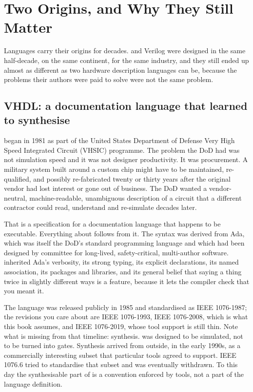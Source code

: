\section{Two Origins, and Why They Still Matter}
\label{sec:philosophy:origins}

Languages carry their origins for decades. \VHDL{} and Verilog were designed in
the same half-decade, on the same continent, for the same industry, and they
still ended up almost as different as two hardware description languages can
be, because the problems their authors were paid to solve were not the same
problem.

\subsection{VHDL: a documentation language that learned to synthesise}

\VHDL{} began in 1981 as part of the United States
Department of Defense Very High Speed Integrated Circuit (VHSIC) programme. The
problem the DoD had was not simulation speed and it was not designer
productivity. It was procurement. A military system built around a custom chip
might have to be maintained, re-qualified, and possibly re-fabricated twenty or
thirty years after the original vendor had lost interest or gone out of
business. The DoD wanted a vendor-neutral, machine-readable, unambiguous
description of a circuit that a different contractor could read, understand and
re-simulate decades later.

That is a specification for a documentation language that happens to be
executable. Everything about \VHDL{} follows from it. The syntax was derived
from Ada, which was itself the DoD's standard programming language and which
had been designed by committee for long-lived, safety-critical, multi-author
software. \VHDL{} inherited Ada's verbosity, its strong typing, its explicit
declarations, its named association, its packages and libraries, and its
general belief that saying a thing twice in slightly different ways is a
feature, because it lets the compiler check that you meant it.

The language was released publicly in 1985 and standardised as IEEE 1076-1987;
the revisions you care about are IEEE 1076-1993, IEEE 1076-2008, which is what
this book assumes, and IEEE 1076-2019, whose tool support is still
thin. Note what is missing from that timeline: synthesis.
\VHDL{} was designed to be simulated, not to be turned into gates. Synthesis
arrived from outside, in the early 1990s, as a commercially interesting subset
that particular tools agreed to support. IEEE 1076.6 tried to standardise that
subset and was eventually withdrawn. To this day the synthesisable part of
\VHDL{} is a convention enforced by tools, not a part of the language
definition.

